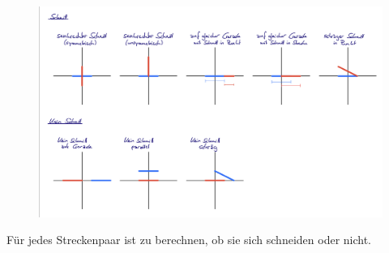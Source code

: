 \documentclass[12pt]{scrartcl}
\begin{document}
\begin{figure}[ht]
    \graphicspath{ {./pictures/} }
    \centering
    \includegraphics[scale=0.2]{Test_Vorlage.jpeg}
\end{figure}

Für jedes Streckenpaar ist zu berechnen, ob sie sich schneiden oder nicht.\\
\end{document}
